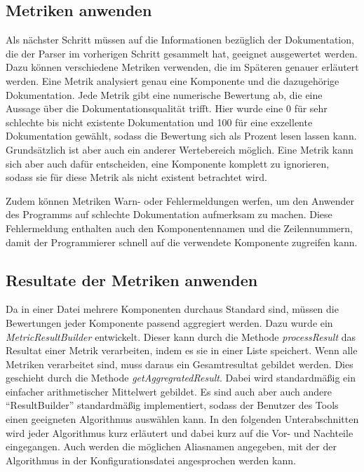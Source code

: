 \subsection{Metriken anwenden}
Als nächster Schritt müssen auf die Informationen bezüglich der Dokumentation, die der Parser im vorherigen Schritt gesammelt hat, geeignet ausgewertet werden. Dazu können verschiedene Metriken verwenden, die im Späteren genauer erläutert werden. Eine Metrik analysiert genau eine Komponente und die dazugehörige Dokumentation. Jede Metrik gibt eine numerische Bewertung ab, die eine Aussage über die Dokumentationsqualität trifft. Hier wurde eine 0 für sehr schlechte bis nicht existente Dokumentation und 100 für eine exzellente Dokumentation gewählt, sodass die Bewertung sich als Prozent lesen lassen kann. Grundsätzlich ist aber auch ein anderer Wertebereich möglich. Eine Metrik kann sich aber auch dafür entscheiden, eine Komponente komplett zu ignorieren, sodass sie für diese Metrik als nicht existent betrachtet wird.

Zudem können Metriken Warn- oder Fehlermeldungen werfen, um den Anwender des Programms auf schlechte Dokumentation aufmerksam zu machen. Diese Fehlermeldung enthalten auch den Komponentennamen und die Zeilennummern, damit der Programmierer schnell auf die verwendete Komponente zugreifen kann.\bigskip
\subsection{Resultate der Metriken anwenden}
Da in einer Datei mehrere Komponenten durchaus Standard sind, müssen die Bewertungen jeder Komponente passend aggregiert werden. Dazu wurde ein \textit{MetricResultBuilder} entwickelt. Dieser kann durch die Methode \textit{processResult} das Resultat einer Metrik verarbeiten, indem es sie in einer Liste speichert. Wenn alle Metriken verarbeitet sind, muss daraus ein Gesamtresultat gebildet werden. Dies geschieht durch die Methode \textit{getAggregratedResult}. Dabei wird standardmäßig ein einfacher arithmetischer Mittelwert gebildet. Es sind auch aber auch andere \enquote{ResultBuilder} standardmäßig implementiert, sodass der Benutzer des Tools einen geeigneten Algorithmus auswählen kann. In den folgenden Unterabschnitten wird jeder Algorithmus kurz erläutert und dabei kurz auf die Vor- und Nachteile eingegangen. Auch werden die möglichen Aliasnamen angegeben, mit der der Algorithmus in der Konfigurationsdatei angesprochen werden kann. 

